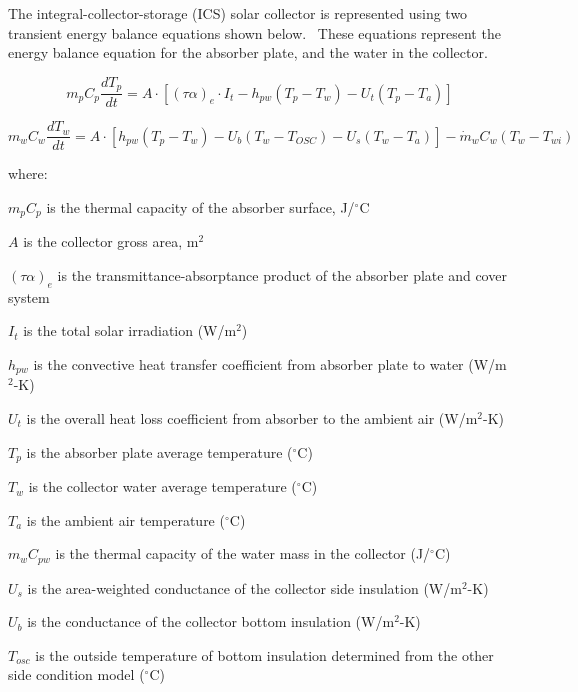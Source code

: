The integral-collector-storage (ICS) solar collector is represented using two transient energy balance equations shown below.~ These equations represent the energy balance equation for the absorber plate, and the water in the collector.

\begin{equation}
{m_p}{C_p}\frac{{d{T_p}}}{{dt}} = A \cdot \left[ {{{\left( {\tau \alpha } \right)}_e} \cdot {I_t} - {h_{pw}}\left( {{T_p} - {T_w}} \right) - {U_t}\left( {{T_p} - {T_a}} \right)} \right]
\end{equation}

\begin{equation}
{m_w}{C_w}\frac{{d{T_w}}}{{dt}} = A \cdot \left[ {{h_{pw}}\left( {{T_p} - {T_w}} \right) - {U_b}\left( {{T_w} - {T_{OSC}}} \right) - {U_s}\left( {{T_w} - {T_a}} \right)} \right] - {\dot m_w}{C_w}\left( {{T_w} - {T_{wi}}} \right)
\end{equation}

where:

\(m_{p} C_{p}\) is the thermal capacity of the absorber surface, J/\(^{\circ}\)C

\(A\) is the collector gross area, m\(^{2}\)

\({(\tau \alpha)}_{e}\) is the transmittance-absorptance product of the absorber plate and cover system

\(I_{t}\) is the total solar irradiation (W/m\(^{2}\))

\(h_{pw}\) is the convective heat transfer coefficient from absorber plate to water (W/m\(^2\)-K)

\(U_{t}\) is the overall heat loss coefficient from absorber to the ambient air (W/m\(^2\)-K)

\(T_{p}\) is the absorber plate average temperature (\(^{\circ}\)C)

\(T_{w}\) is the collector water average temperature (\(^{\circ}\)C)

\(T_{a}\) is the ambient air temperature (\(^{\circ}\)C)

\(m_{w} C_{pw}\) is the thermal capacity of the water mass in the collector (J/\(^{\circ}\)C)

\(U_{s}\) is the area-weighted conductance of the collector side insulation (W/m\(^{2}\)-K)

\(U_{b}\) is the conductance of the collector bottom insulation (W/m\(^{2}\)-K)

\(T_{osc}\) is the outside temperature of bottom insulation determined from the other side condition model (\(^{\circ}\)C)

